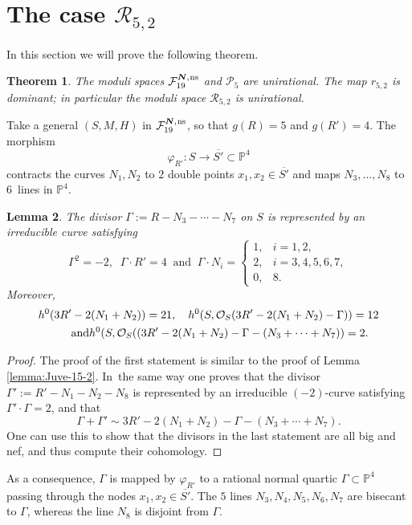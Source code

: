 \documentclass[11pt]{article}
\newcommand{\ns}{{\mkern1mu\mathrm{ns}}}
\newcommand{\bN}{\boldsymbol{N}}
\theoremstyle{plain}
\newtheorem{thm}{Theorem}[section]
\newtheorem{lemma}[thm]{Lemma}
\theoremstyle{definition}
\newcommand\PP{{\mathbb P}}
\newcommand\F{{\mathcal F}}
\renewcommand\O{{\mathcal O}}
\renewcommand\P{{\mathcal P}}
\newcommand\R{{\mathcal R}}
\begin{document}
\section{The case \texorpdfstring{$\R_{5,2}$}{R}}

In this section we will prove the following theorem.

\begin{thm}\label{thm:5,2}
The moduli spaces $\F_{19}^{\bN,\ns}$ and $\P_{5}$ are unirational. The map $r_{5,2}$ is dominant; in particular the moduli space $\R_{5,2}$ is unirational.
\end{thm}

Take a general $(S,M,H)$ in $\F_{19}^{\bN,\ns}$, so that $g(R)=5$ and $g(R')=4$. The morphism
\[
\varphi_{R'}:S\to \overline{S'}\subset \PP^4
\]
contracts the curves $N_1,N_2$ to $2$ double points $x_1,x_2 \in \overline{S'}$ and maps $N_3,\ldots,N_8$ to $6$~lines in $\PP^4$.

\begin{lemma} \label{lemma:Juve-15-4}
The divisor
$
\Gamma:=R-N_3-\cdots-N_7
$
on $S$ is represented by an irreducible curve satisfying
\[
 \Gamma^2=-2, \;\; \Gamma\cdot R'=4 \;\; \mbox{and} \;\; \Gamma \cdot N_i =
\begin{cases}
1, & i=1,2, \\
2, & i=3,4,5,6,7,\\
0, & 8.
\end{cases}
\]
Moreover,
\begin{gather*}
h^0(3R'-2(N_1+N_2))=21,\quad h^0(S,\O_S(3R'-2(N_1+N_2)-\Gamma))=12\\
\tag*{\textit{and}}
h^0(S,\O_S((3R'-2(N_1+N_2)-\Gamma-(N_3+\cdots+N_7))=2.
\end{gather*}
\end{lemma}

\begin{proof}
The proof of the first statement is similar to the proof of Lemma \ref{lemma:Juve-15-2}. In~the same way one proves that the divisor
$\Gamma':=R'-N_1-N_2-N_8$ is represented by an irreducible $(-2)$-curve satisfying $\Gamma' \cdot \Gamma=2$, and that
\[
\Gamma+\Gamma' \sim 3R'-2(N_1+N_2)-\Gamma-(N_3+\cdots+N_7).
\]
One can use this to show that the divisors in the last statement are all big and nef, and thus compute their cohomology.
\end{proof}

As a consequence, $\Gamma$ is mapped by $\varphi_{R'}$ to a rational normal quartic $\Gamma\subset \PP^4$ passing through the nodes $x_1,x_2\in \overline{S'}$. The $5$ lines $N_3,N_4,N_5,N_6,N_7$ are bisecant to $\Gamma$, whereas the line $N_8$ is disjoint from $\Gamma$.
\end{document}
